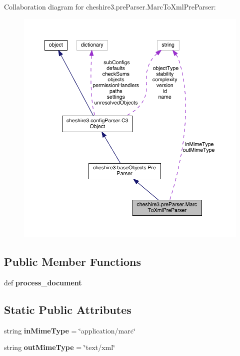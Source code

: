 Collaboration diagram for cheshire3.\-pre\-Parser.\-Marc\-To\-Xml\-Pre\-Parser\-:
\nopagebreak
\begin{figure}[H]
\begin{center}
\leavevmode
\includegraphics[width=350pt]{classcheshire3_1_1pre_parser_1_1_marc_to_xml_pre_parser__coll__graph}
\end{center}
\end{figure}
\subsection*{Public Member Functions}
\begin{DoxyCompactItemize}
\item 
\hypertarget{classcheshire3_1_1pre_parser_1_1_marc_to_xml_pre_parser_aad22c9e97a6f807c6427a5a987f751af}{def {\bfseries process\-\_\-document}}\label{classcheshire3_1_1pre_parser_1_1_marc_to_xml_pre_parser_aad22c9e97a6f807c6427a5a987f751af}

\end{DoxyCompactItemize}
\subsection*{Static Public Attributes}
\begin{DoxyCompactItemize}
\item 
\hypertarget{classcheshire3_1_1pre_parser_1_1_marc_to_xml_pre_parser_a91dd9b39341dbd3885ca6f0e0133eec4}{string {\bfseries in\-Mime\-Type} = \char`\"{}application/marc\char`\"{}}\label{classcheshire3_1_1pre_parser_1_1_marc_to_xml_pre_parser_a91dd9b39341dbd3885ca6f0e0133eec4}

\item 
\hypertarget{classcheshire3_1_1pre_parser_1_1_marc_to_xml_pre_parser_afc0dfa3eebee801fff59f29699dc0cfa}{string {\bfseries out\-Mime\-Type} = \char`\"{}text/xml\char`\"{}}\label{classcheshire3_1_1pre_parser_1_1_marc_to_xml_pre_parser_afc0dfa3eebee801fff59f29699dc0cfa}

\end{DoxyCompactItemize}
